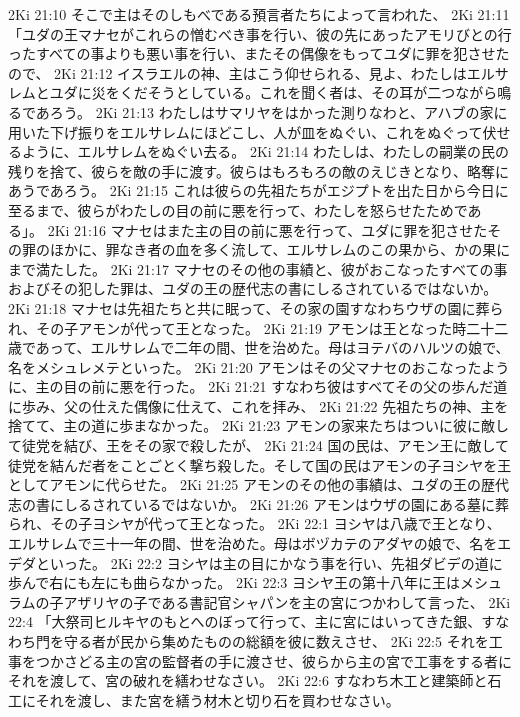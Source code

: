 2Ki 21:10  そこで主はそのしもべである預言者たちによって言われた、
2Ki 21:11  「ユダの王マナセがこれらの憎むべき事を行い、彼の先にあったアモリびとの行ったすべての事よりも悪い事を行い、またその偶像をもってユダに罪を犯させたので、
2Ki 21:12  イスラエルの神、主はこう仰せられる、見よ、わたしはエルサレムとユダに災をくだそうとしている。これを聞く者は、その耳が二つながら鳴るであろう。
2Ki 21:13  わたしはサマリヤをはかった測りなわと、アハブの家に用いた下げ振りをエルサレムにほどこし、人が皿をぬぐい、これをぬぐって伏せるように、エルサレムをぬぐい去る。
2Ki 21:14  わたしは、わたしの嗣業の民の残りを捨て、彼らを敵の手に渡す。彼らはもろもろの敵のえじきとなり、略奪にあうであろう。
2Ki 21:15  これは彼らの先祖たちがエジプトを出た日から今日に至るまで、彼らがわたしの目の前に悪を行って、わたしを怒らせたためである」。
2Ki 21:16  マナセはまた主の目の前に悪を行って、ユダに罪を犯させたその罪のほかに、罪なき者の血を多く流して、エルサレムのこの果から、かの果にまで満たした。
2Ki 21:17  マナセのその他の事績と、彼がおこなったすべての事およびその犯した罪は、ユダの王の歴代志の書にしるされているではないか。
2Ki 21:18  マナセは先祖たちと共に眠って、その家の園すなわちウザの園に葬られ、その子アモンが代って王となった。
2Ki 21:19  アモンは王となった時二十二歳であって、エルサレムで二年の間、世を治めた。母はヨテバのハルツの娘で、名をメシュレメテといった。
2Ki 21:20  アモンはその父マナセのおこなったように、主の目の前に悪を行った。
2Ki 21:21  すなわち彼はすべてその父の歩んだ道に歩み、父の仕えた偶像に仕えて、これを拝み、
2Ki 21:22  先祖たちの神、主を捨てて、主の道に歩まなかった。
2Ki 21:23  アモンの家来たちはついに彼に敵して徒党を結び、王をその家で殺したが、
2Ki 21:24  国の民は、アモン王に敵して徒党を結んだ者をことごとく撃ち殺した。そして国の民はアモンの子ヨシヤを王としてアモンに代らせた。
2Ki 21:25  アモンのその他の事績は、ユダの王の歴代志の書にしるされているではないか。
2Ki 21:26  アモンはウザの園にある墓に葬られ、その子ヨシヤが代って王となった。
2Ki 22:1  ヨシヤは八歳で王となり、エルサレムで三十一年の間、世を治めた。母はボヅカテのアダヤの娘で、名をエデダといった。
2Ki 22:2  ヨシヤは主の目にかなう事を行い、先祖ダビデの道に歩んで右にも左にも曲らなかった。
2Ki 22:3  ヨシヤ王の第十八年に王はメシュラムの子アザリヤの子である書記官シャパンを主の宮につかわして言った、
2Ki 22:4  「大祭司ヒルキヤのもとへのぼって行って、主に宮にはいってきた銀、すなわち門を守る者が民から集めたものの総額を彼に数えさせ、
2Ki 22:5  それを工事をつかさどる主の宮の監督者の手に渡させ、彼らから主の宮で工事をする者にそれを渡して、宮の破れを繕わせなさい。
2Ki 22:6  すなわち木工と建築師と石工にそれを渡し、また宮を繕う材木と切り石を買わせなさい。
